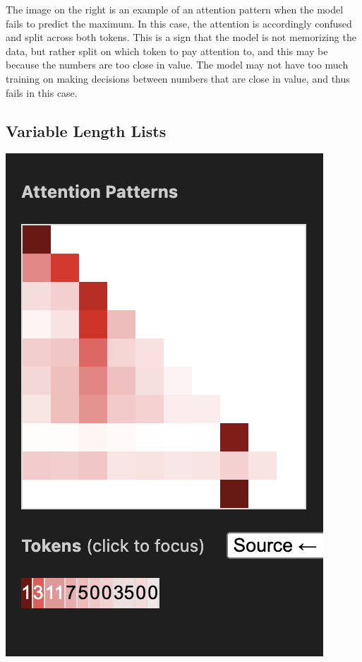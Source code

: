 \documentclass{article}
\begin{document}
The image on the right is an example of an attention pattern when the model fails to predict the maximum. In this case, the attention is accordingly confused and split across both tokens. This is a sign that the model is not memorizing the data, but rather split on which token to pay attention to, and this may be because the numbers are too close in value. The model may not have too much training on making decisions between numbers that are close in value, and thus fails in this case.

\subsection{Variable Length Lists}

\begin{center}
    \includegraphics[scale=0.4]{images/att_variable.png}

\end{center}
\end{document}
